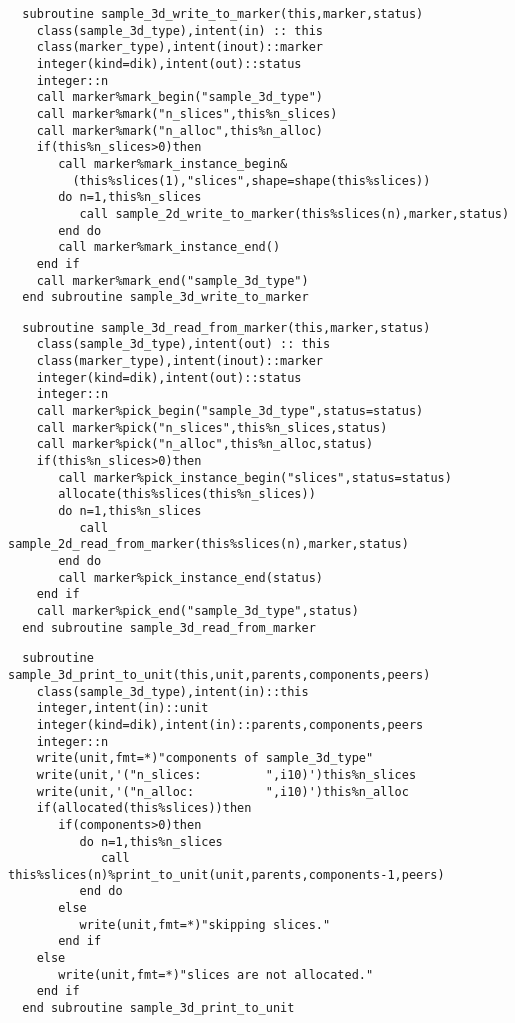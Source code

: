 \begin{Verbatim}
  subroutine sample_3d_write_to_marker(this,marker,status)
    class(sample_3d_type),intent(in) :: this
    class(marker_type),intent(inout)::marker
    integer(kind=dik),intent(out)::status 
    integer::n
    call marker%mark_begin("sample_3d_type")
    call marker%mark("n_slices",this%n_slices)
    call marker%mark("n_alloc",this%n_alloc)
    if(this%n_slices>0)then
       call marker%mark_instance_begin&
         (this%slices(1),"slices",shape=shape(this%slices))
       do n=1,this%n_slices
          call sample_2d_write_to_marker(this%slices(n),marker,status)
       end do
       call marker%mark_instance_end()
    end if
    call marker%mark_end("sample_3d_type")
  end subroutine sample_3d_write_to_marker
\end{Verbatim}

\begin{Verbatim}
  subroutine sample_3d_read_from_marker(this,marker,status)
    class(sample_3d_type),intent(out) :: this
    class(marker_type),intent(inout)::marker
    integer(kind=dik),intent(out)::status  
    integer::n
    call marker%pick_begin("sample_3d_type",status=status)
    call marker%pick("n_slices",this%n_slices,status)
    call marker%pick("n_alloc",this%n_alloc,status)
    if(this%n_slices>0)then
       call marker%pick_instance_begin("slices",status=status)
       allocate(this%slices(this%n_slices))
       do n=1,this%n_slices
          call sample_2d_read_from_marker(this%slices(n),marker,status)
       end do
       call marker%pick_instance_end(status)
    end if
    call marker%pick_end("sample_3d_type",status)
  end subroutine sample_3d_read_from_marker
\end{Verbatim}

\begin{Verbatim}
  subroutine sample_3d_print_to_unit(this,unit,parents,components,peers)
    class(sample_3d_type),intent(in)::this
    integer,intent(in)::unit
    integer(kind=dik),intent(in)::parents,components,peers
    integer::n
    write(unit,fmt=*)"components of sample_3d_type"
    write(unit,'("n_slices:         ",i10)')this%n_slices
    write(unit,'("n_alloc:          ",i10)')this%n_alloc
    if(allocated(this%slices))then
       if(components>0)then
          do n=1,this%n_slices
             call this%slices(n)%print_to_unit(unit,parents,components-1,peers)
          end do
       else
          write(unit,fmt=*)"skipping slices."
       end if
    else
       write(unit,fmt=*)"slices are not allocated."
    end if
  end subroutine sample_3d_print_to_unit
\end{Verbatim}

